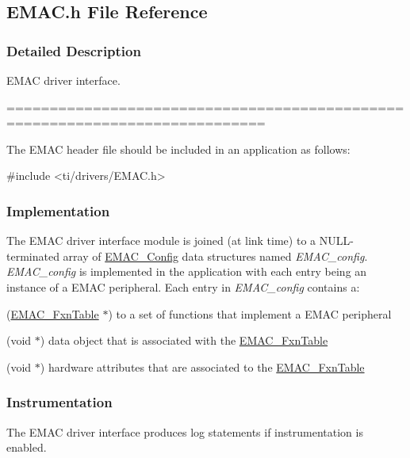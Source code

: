 \subsection{E\+M\+A\+C.\+h File Reference}
\label{_e_m_a_c_8h}


\subsubsection{Detailed Description}
E\+M\+A\+C driver interface. 

============================================================================

The E\+M\+A\+C header file should be included in an application as follows\+: 
\begin{DoxyCode}
\textcolor{preprocessor}{#include <ti/drivers/EMAC.h>}
\end{DoxyCode}


\subsubsection*{Implementation}

The E\+M\+A\+C driver interface module is joined (at link time) to a N\+U\+L\+L-\/terminated array of \hyperlink{struct_e_m_a_c___config}{E\+M\+A\+C\+\_\+\+Config} data structures named {\itshape E\+M\+A\+C\+\_\+config}. {\itshape E\+M\+A\+C\+\_\+config} is implemented in the application with each entry being an instance of a E\+M\+A\+C peripheral. Each entry in {\itshape E\+M\+A\+C\+\_\+config} contains a\+:
\begin{DoxyItemize}
\item (\hyperlink{struct_e_m_a_c___fxn_table}{E\+M\+A\+C\+\_\+\+Fxn\+Table} $\ast$) to a set of functions that implement a E\+M\+A\+C peripheral
\item (void $\ast$) data object that is associated with the \hyperlink{struct_e_m_a_c___fxn_table}{E\+M\+A\+C\+\_\+\+Fxn\+Table}
\item (void $\ast$) hardware attributes that are associated to the \hyperlink{struct_e_m_a_c___fxn_table}{E\+M\+A\+C\+\_\+\+Fxn\+Table}
\end{DoxyItemize}

\subsubsection*{Instrumentation}

The E\+M\+A\+C driver interface produces log statements if instrumentation is enabled.

